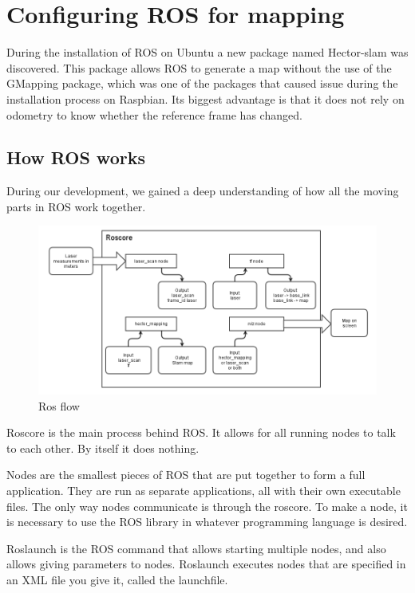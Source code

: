 \clearpage
\section{Configuring ROS for mapping}

During the installation of ROS on Ubuntu a new package named Hector-slam was discovered.
This package allows ROS to generate a map without the use of the GMapping package, which was one of the packages that caused issue during the installation process on Raspbian. Its biggest advantage is that it does not rely on odometry to know whether the reference frame has changed.

\subsection{How ROS works}
During our development, we gained a deep understanding of how all the moving parts in ROS work together.

\begin{figure}[H]
	\centering
	\includegraphics[width=1\linewidth]{images/ROSflow.png}
	\caption{Ros flow}
\end{figure}

Roscore is the main process behind ROS. It allows for all running nodes to talk to each other. By itself it does nothing.

Nodes are the smallest pieces of ROS that are put together to form a full application. They are run as separate applications, all with their own executable files. The only way nodes communicate is through the roscore. To make a node, it is necessary to use the ROS library in whatever programming language is desired.

Roslaunch is the ROS command that allows starting multiple nodes, and also allows giving parameters to nodes. Roslaunch executes nodes that are specified in an XML file you give it, called the launchfile.

